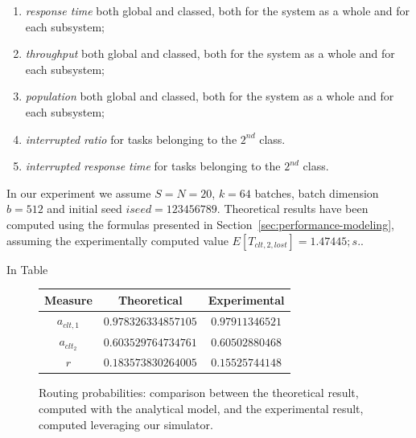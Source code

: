 \begin{enumerate}
	\item \textit{response time} both global and classed, both for the system as a whole and for each subsystem;
	
	\item \textit{throughput} both global and classed, both for the system as a whole and for each subsystem;
	
	\item \textit{population} both global and classed, both for the system as a whole and for each subsystem;
	
	\item \textit{interrupted ratio} for tasks belonging to the $2^{nd}$ class.
	
	\item \textit{interrupted response time} for tasks belonging to the $2^{nd}$ class.
\end{enumerate}

In our experiment we assume $S=N=20$, $k=64$ batches, batch dimension $b=512$ and initial seed $iseed=123456789$.
%
Theoretical results have been computed using the formulas presented in Section~\ref{sec:performance-modeling}, assuming the experimentally computed value $E[T_{clt,2,lost}]=1.47445;s.$.

In Table

\begin{figure}
	\begin{center}
		\begin{tabular}{|c||c|c|}
			\hline
			Measure & Theoretical & Experimental\\
			\hline
			$a_{clt,1}$  & $0.978326334857105$ & $0.97911346521$ \\
			$a_{clt_2}$  & $0.603529764734761$ & $0.60502880468$ \\
			$r$          & $0.183573830264005$ & $0.15525744148$ \\	
			\hline
		\end{tabular}
	\end{center}
	\caption{Routing probabilities: comparison between the theoretical result, computed with the analytical model, and the experimental result, computed leveraging our simulator.}
	\label{tbl:evaluation-routing-probabilities}
\end{figure}

